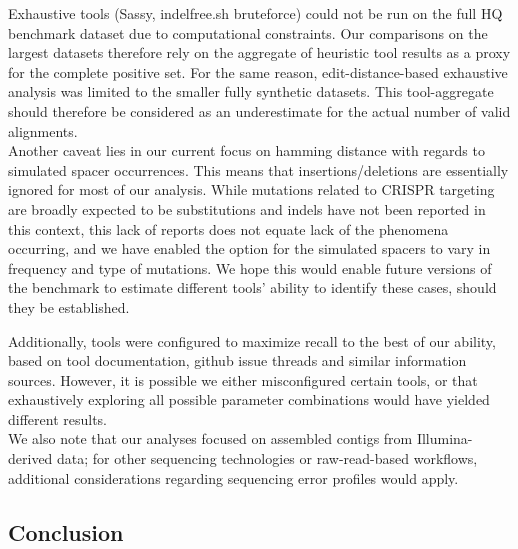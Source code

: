 \documentclass[
]{article}
\begin{document}
Exhaustive tools (Sassy, indelfree.sh bruteforce) could not be run on
the full HQ benchmark dataset due to computational constraints. Our
comparisons on the largest datasets therefore rely on the aggregate of
heuristic tool results as a proxy for the complete positive set. For the
same reason, edit-distance-based exhaustive analysis was limited to the
smaller fully synthetic datasets. This tool-aggregate should therefore
be considered as an underestimate for the actual number of valid
alignments.\\
Another caveat lies in our current focus on hamming distance with
regards to simulated spacer occurrences. This means that
insertions/deletions are essentially ignored for most of our analysis.
While mutations related to CRISPR targeting are broadly expected to be
substitutions and indels have not been reported in this context, this
lack of reports does not equate lack of the phenomena occurring, and we
have enabled the option for the simulated spacers to vary in frequency
and type of mutations. We hope this would enable future versions of the
benchmark to estimate different tools' ability to identify these cases,
should they be established.

Additionally, tools were configured to maximize recall to the best of
our ability, based on tool documentation, github issue threads and
similar information sources. However, it is possible we either
misconfigured certain tools, or that exhaustively exploring all possible
parameter combinations would have yielded different results.\\
We also note that our analyses focused on assembled contigs from
Illumina-derived data; for other sequencing technologies or
raw-read-based workflows, additional considerations regarding sequencing
error profiles would apply.

\subsection{Conclusion}\label{sec-conclusion}
\end{document}
